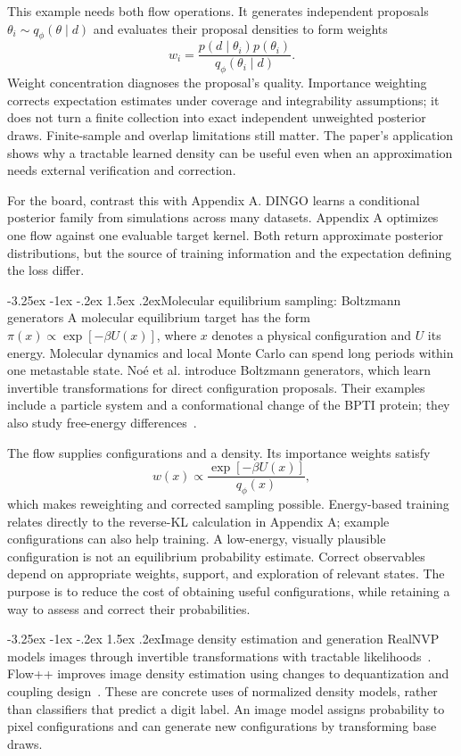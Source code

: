 \documentclass[11pt,a4paper]{article}
\makeatletter
\renewcommand\subsection{\@startsection{subsection}{2}{\z@}%
  {-3.25ex \@plus -1ex \@minus -.2ex}%
  {1.5ex \@plus .2ex}{\normalfont\large}}
\makeatother
\begin{document}
This example needs both flow operations. It generates independent proposals
$\theta_i\sim q_\phi(\theta\mid d)$ and evaluates their proposal densities to
form weights
\[
 w_i=\frac{p(d\mid\theta_i)p(\theta_i)}{q_\phi(\theta_i\mid d)}.
\]
Weight concentration diagnoses the proposal's quality. Importance weighting
corrects expectation estimates under coverage and integrability assumptions;
it does not turn a finite collection into exact independent unweighted
posterior draws. Finite-sample and overlap limitations still matter. The
paper's application shows why a tractable learned density can be useful even
when an approximation needs external verification and correction.

For the board, contrast this with Appendix A. DINGO learns a conditional
posterior family from simulations across many datasets. Appendix A optimizes
one flow against one evaluable target kernel. Both return approximate
posterior distributions, but the source of training information and the
expectation defining the loss differ.

\subsection{Molecular equilibrium sampling: Boltzmann generators}
A molecular equilibrium target has the form
$\pi(x)\propto\exp[-\beta U(x)]$, where $x$ denotes a physical configuration
and $U$ its energy. Molecular dynamics and local Monte Carlo can spend long
periods within one metastable state. No\'e et al. introduce Boltzmann generators,
which learn invertible transformations for direct configuration proposals.
Their examples include a particle system and a conformational change of the
BPTI protein; they also study free-energy differences~\cite{boltzmann}.

The flow supplies configurations and a density. Its importance weights satisfy
\[
 w(x)\propto\frac{\exp[-\beta U(x)]}{q_\phi(x)},
\]
which makes reweighting and corrected sampling possible.
Energy-based training relates directly to the reverse-KL calculation in
Appendix A; example configurations can also help training. A low-energy,
visually plausible configuration is not an equilibrium probability estimate.
Correct observables depend on appropriate weights, support, and exploration
of relevant states. The purpose is to reduce the cost of obtaining useful
configurations, while retaining a way to assess and correct their probabilities.

\subsection{Image density estimation and generation}
RealNVP models images through invertible transformations with tractable
likelihoods~\cite{realnvp}. Flow++ improves image density estimation using
changes to dequantization and coupling design~\cite{flowpp}. These are concrete
uses of normalized density models, rather than classifiers that predict a
digit label. An image model assigns probability to pixel configurations and
can generate new configurations by transforming base draws.
\end{document}
